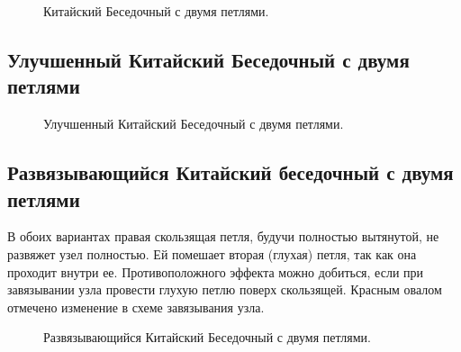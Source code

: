 \begin{figure}[H]\centering
	\subfloat[Результат]{\label{ris:Chinese_twin_loop_Bowline_3}
	\tcbox[enhanced jigsaw,colframe=black,opacityframe=0.5,opacityback=0.5]
		{\centering
			}
		}
	\caption{Китайский Беседочный с двумя петлями.}\label{ris:Chinese_twin_loop_Bowline}
\end{figure}

\subsection{Улучшенный Китайский Беседочный с двумя петлями}

\begin{figure}[H]\centering
	\subfloat[Завязывание]{\label{ris:Chinese_twin_loop_Bowline_my_1_1}
	\tcbox[enhanced jigsaw,colframe=black,opacityframe=0.5,opacityback=0.5]
		{\centering
			}
		}
\hfil
	\subfloat[Результат]{\label{ris:Chinese_twin_loop_Bowline_my_1_2}
	\tcbox[enhanced jigsaw,colframe=black,opacityframe=0.5,opacityback=0.5]
		{\centering
			}
		}
	\caption{Улучшенный Китайский Беседочный с двумя петлями.}\label{ris:Chinese_twin_loop_Bowline_my_1}
\end{figure}

\subsection{Развязывающийся Китайский беседочный с двумя петлями}

В обоих вариантах правая скользящая петля, будучи полностью вытянутой, не развяжет узел полностью. Ей помешает вторая (глухая) петля, так как она проходит внутри ее. Противоположного эффекта можно добиться, если при завязывании узла провести глухую петлю поверх скользящей. Красным овалом отмечено изменение в схеме завязывания узла.

\begin{figure}[H]\centering
	\subfloat[Завязывание]{\label{ris:Chinese_twin_loop_Bowline_my_2_1}
	\tcbox[enhanced jigsaw,colframe=black,opacityframe=0.5,opacityback=0.5]
		{\centering
			}
		}
\hfil
	\subfloat[Результат]{\label{ris:Chinese_twin_loop_Bowline_my_2_2}
	\tcbox[enhanced jigsaw,colframe=black,opacityframe=0.5,opacityback=0.5]
		{\centering
			}
		}
	\caption{Развязывающийся Китайский Беседочный с двумя петлями.}\label{ris:Chinese_twin_loop_Bowline_my_2}
\end{figure}

